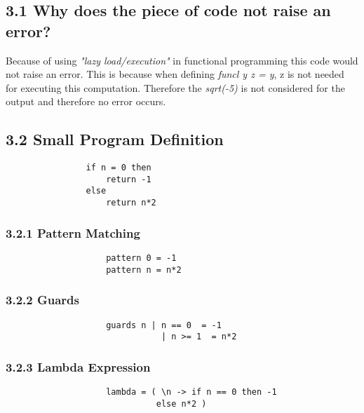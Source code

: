 \documentclass{article}
\begin{document}
	\pagestyle{fancy}
	\hfill
	
	\subsection*{3.1 Why does the piece of code not raise an error?}
	\begin{adjustwidth}{2em}{2em}
		Because of using \textit{"lazy load/execution"} in functional programming this code would not raise an error. This is because when defining \textit{funcl y z = y}, z is not needed for executing this computation. Therefore the \textit{sqrt(-5)} is not considered for the output and therefore no error occurs.
	\end{adjustwidth}
	
	\subsection*{3.2 Small Program Definition}
	\begin{adjustwidth}{2em}{2em}
		\begin{tcolorbox}
			\begin{verbatim}
				if n = 0 then
				    return -1
				else
				    return n*2
			\end{verbatim}
		\end{tcolorbox}
		\subsubsection*{3.2.1 Pattern Matching}
		\begin{adjustwidth}{2em}{}
			\begin{tcolorbox}
				\begin{verbatim}
					pattern 0 = -1
					pattern n = n*2
				\end{verbatim}
			\end{tcolorbox}
		\end{adjustwidth}
		\subsubsection*{3.2.2 Guards}
		\begin{adjustwidth}{2em}{}
			\begin{tcolorbox}
				\begin{verbatim}
					guards n | n == 0  = -1
					           | n >= 1  = n*2
				\end{verbatim}
			\end{tcolorbox}
		\end{adjustwidth}
		\subsubsection*{3.2.3 Lambda Expression}
		\begin{adjustwidth}{2em}{}
			\begin{tcolorbox}
				\begin{verbatim}
					lambda = ( \n -> if n == 0 then -1 
					          else n*2 )
				\end{verbatim}
			\end{tcolorbox}
		\end{adjustwidth}
	\end{adjustwidth}
	
\end{document}
